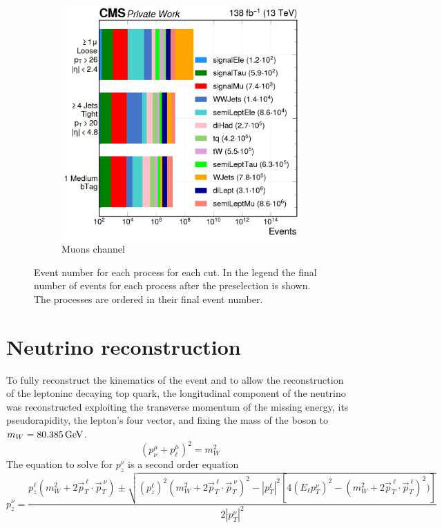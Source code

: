 \begin{figure}[H]
     \vspace{0.5cm}
     \begin{subfigure}{0.7\linewidth}
         \centering
        \includegraphics[width=\linewidth]{fig//chap07-selection/mu_selection.png}
         \caption{Muons channel}
     \end{subfigure}
     \vspace{0.5cm}
        \caption{Event number for each process for each cut. In the legend the final number of events for each process after the preselection is shown. The processes are ordered in their final event number.}
        \label{fig:event_selection}
\end{figure}
\newpage
\section{Neutrino reconstruction}
To fully reconstruct the kinematics of the event and to allow the reconstruction of the leptoninc decaying top quark, the longitudinal component of the neutrino was reconstructed exploiting the transverse momentum of the missing energy, its pseudorapidity, the lepton's four vector, and fixing the mass of the \PW boson to $m_W=80.385 {\,\text{Ge\hspace{-.08em}V}}$.
\begin{equation}
    (p^\mu_\nu+p^\mu_\ell)^2=m_W^2 
\end{equation}
The equation to solve for $p_z^{\nu}$ is a second order equation
\begin{equation*}
    p_z^\nu=\frac{p_z^\ell(m_W^2+2\vec{p}_T^{\:\ell} \cdot \vec{p}_T^{\:\nu})\pm\sqrt{(p_z^\ell)^2 (m_W^2+2\vec{p}_T^{\:\ell} \cdot \vec{p}_T^{\:\nu})^2-|p_T^\ell|^2[4(E_\ell p_T^\nu)^2-(m_W^2+2\vec{p}_T^{\:\ell} \cdot \vec{p}_T^{\:\ell})^2)]}}{2|p_T^\nu|^2}
\end{equation*}

